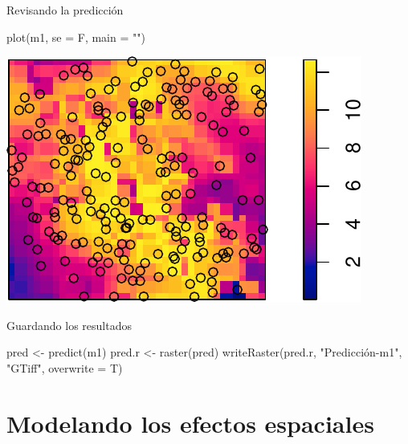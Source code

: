 \documentclass[
  11pt,
  ignorenonframetext,
]{beamer}
\newenvironment{Shaded}{}{}
\newcommand{\AttributeTok}[1]{\textcolor[rgb]{0.49,0.56,0.16}{#1}}
\newcommand{\FunctionTok}[1]{\textcolor[rgb]{0.02,0.16,0.49}{#1}}
\newcommand{\NormalTok}[1]{#1}
\newcommand{\OtherTok}[1]{\textcolor[rgb]{0.00,0.44,0.13}{#1}}
\newcommand{\StringTok}[1]{\textcolor[rgb]{0.25,0.44,0.63}{#1}}
\begin{document}
\begin{frame}[fragile]{Revisando la predicción}
\protect\hypertarget{revisando-la-predicciuxf3n}{}
\begin{Shaded}
\begin{Highlighting}[]
\FunctionTok{plot}\NormalTok{(m1, }\AttributeTok{se =}\NormalTok{ F, }\AttributeTok{main =} \StringTok{""}\NormalTok{)}
\end{Highlighting}
\end{Shaded}

\begin{center}\includegraphics{Tutorial-spatstat-2_files/figure-beamer/unnamed-chunk-22-1} \end{center}
\end{frame}

\begin{frame}[fragile]{Guardando los resultados}
\protect\hypertarget{guardando-los-resultados}{}
\begin{Shaded}
\begin{Highlighting}[]
\NormalTok{pred }\OtherTok{\textless{}{-}} \FunctionTok{predict}\NormalTok{(m1)}
\NormalTok{pred.r }\OtherTok{\textless{}{-}} \FunctionTok{raster}\NormalTok{(pred)}
\FunctionTok{writeRaster}\NormalTok{(pred.r, }\StringTok{"Predicción{-}m1"}\NormalTok{, }\StringTok{"GTiff"}\NormalTok{,}
            \AttributeTok{overwrite =}\NormalTok{ T)}
\end{Highlighting}
\end{Shaded}
\end{frame}

\hypertarget{modelando-los-efectos-espaciales}{%
\section{Modelando los efectos
espaciales}\label{modelando-los-efectos-espaciales}}
\end{document}
